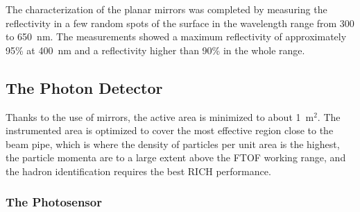 \documentclass[5p,times,twocolumn]{elsarticle}
\begin{document}
The characterization of the planar mirrors was completed by measuring the reflectivity in a few random spots of
the surface in the wavelength range from 300 to 650~nm. The measurements showed a maximum reflectivity of
approximately 95\% at 400~nm and a reflectivity higher than 90\% in the whole range.

\subsection{The Photon Detector}

Thanks to the use of mirrors, the active area is minimized to about 1~m$^2$. The instrumented area is optimized to cover the most effective region close to the beam pipe, which is where the density of particles per unit area is the highest, the particle momenta are to a large extent above the FTOF working range, and the hadron identification requires the best RICH performance.

\subsubsection{The Photosensor}
\end{document}
